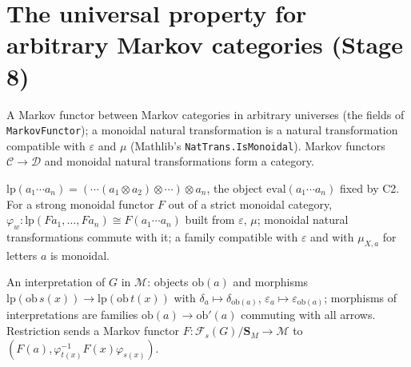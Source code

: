 \section{The universal property for arbitrary Markov categories (Stage 8)}

\begin{definition}
\label{s8:markovfun}
\leanok
{}
A Markov functor between Markov categories in arbitrary universes (the fields of
\texttt{MarkovFunctor}); a monoidal natural transformation is a natural transformation compatible
with $\varepsilon$ and $\mu$ (Mathlib's \texttt{NatTrans.IsMonoidal}). Markov functors $\mathcal C
\to \mathcal D$ and monoidal natural transformations form a category.
\end{definition}

\begin{definition}
\label{s8:products}
\leanok
{}
$\mathrm{lp}(a_1 \cdots a_n) = (\cdots(a_1 \otimes a_2) \otimes \cdots) \otimes a_n$, the object
$\mathrm{eval}(a_1 \cdots a_n)$ fixed by C2. For a strong monoidal functor $F$ out of a strict
monoidal category, $\varphi_w : \mathrm{lp}(F a_1, \ldots, F a_n) \cong F(a_1 \cdots a_n)$ built from
$\varepsilon$, $\mu$; monoidal natural transformations commute with it; a family compatible with
$\varepsilon$ and with $\mu_{X, a}$ for letters $a$ is monoidal.
\end{definition}

\begin{definition}
\label{s8:interp}
\leanok
{}
An interpretation of $G$ in $\mathcal M$: objects $\mathrm{ob}(a)$ and morphisms
$\mathrm{lp}(\mathrm{ob}\, s(x)) \to \mathrm{lp}(\mathrm{ob}\, t(x))$ with $\delta_a \mapsto
\delta_{\mathrm{ob}(a)}$, $\varepsilon_a \mapsto \varepsilon_{\mathrm{ob}(a)}$; morphisms of
interpretations are families $\mathrm{ob}(a) \to \mathrm{ob}'(a)$ commuting with all arrows.
Restriction sends a Markov functor $F : \mathcal F_s(G)/\mathbf S_M \to \mathcal M$ to
$(F(a), \varphi_{t(x)}^{-1} F(x) \varphi_{s(x)})$.
\end{definition}

